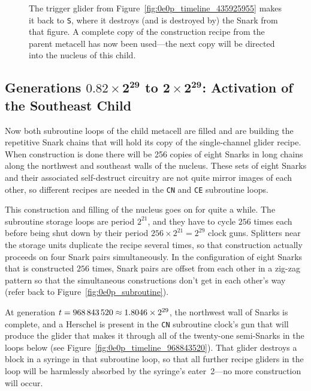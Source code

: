 \begin{figure}[!htb]
	\centering
	\caption{The trigger glider from Figure~\ref{fig:0e0p_timeline_435925955} makes it back to \texttt{S}, where it destroys (and is destroyed by) the Snark from that figure. A complete copy of the construction recipe from the parent metacell has now been used---the next copy will be directed into the nucleus of this child.}
	\label{fig:0e0p_timeline_438935522}
\end{figure}


\subsection{Generations $\mathbf{0.82 \times 2^{29}}$ to $\mathbf{2 \times 2^{29}}$: Activation of the Southeast Child}\label{sec:0e0p_timeline_nucleus_fill}

Now both subroutine loops of the child metacell are filled and are building the repetitive Snark chains that will hold its copy of the single-channel glider recipe. When construction is done there will be 256 copies of eight Snarks in long chains along the northwest and southeast walls of the nucleus. These sets of eight Snarks and their associated self-destruct circuitry are not quite mirror images of each other, so different recipes are needed in the \texttt{CN} and \texttt{CE} subroutine loops.

This construction and filling of the nucleus goes on for quite a while. The subroutine storage loops are period $2^{21}$, and they have to cycle $256$ times each before being shut down by their period $256 \times 2^{21} = 2^{29}$ clock guns. Splitters near the storage units duplicate the recipe several times, so that construction actually proceeds on four Snark pairs simultaneously. In the configuration of eight Snarks that is constructed $256$ times, Snark pairs are offset from each other in a zig-zag pattern so that the simultaneous constructions don't get in each other's way (refer back to Figure~\ref{fig:0e0p_subroutine}).

At generation $t = 968{\,}843{\,}520 \approx 1.8046 \times 2^{29}$, the northwest wall of Snarks is complete, and a Herschel is present in the \texttt{CN} subroutine clock's gun that will produce the glider that makes it through all of the twenty-one semi-Snarks in the loops below (see Figure~\ref{fig:0e0p_timeline_968843520}). That glider destroys a block in a syringe in that subroutine loop, so that all further recipe gliders in the loop will be harmlessly absorbed by the syringe's eater~2---no more construction will occur.

